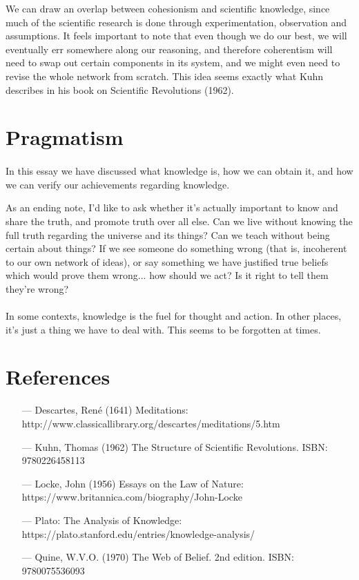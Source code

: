 \documentclass[11pt]{article}
\begin{document}
	We can draw an overlap between cohesionism and scientific knowledge, since much of the scientific research is done through experimentation, observation and assumptions. It feels important to note that even though we do our best, we will eventually err somewhere along our reasoning, and therefore coherentism will need to swap out certain components in its system, and we might even need to revise the whole network from scratch. This idea seems exactly what Kuhn describes in his book on Scientific Revolutions (1962).
	
	\pagebreak{}
	\section*{Pragmatism}
	\paragraph{} In this essay we have discussed what knowledge is, how we can obtain it, and how we can verify our achievements regarding knowledge.

	As an ending note, I'd like to ask whether it's actually important to know and share the truth, and promote truth over all else. Can we live without knowing the full truth regarding the universe and its things? Can we teach without being certain about things? If we see someone do something wrong (that is, incoherent to our own network of ideas), or say something we have justified true beliefs which would prove them wrong... how should we act? Is it right to tell them they're wrong?
	
	\paragraph{} In some contexts, knowledge is the fuel for thought and action. In other places, it's just a thing we have to deal with. This seems to be forgotten at times.

	\section*{References}
	\begin{itemize}
	\item[---] Descartes, René (1641) Meditations: http://www.classicallibrary.org/descartes/meditations/5.htm

	\item[---] Kuhn, Thomas (1962) The Structure of Scientific Revolutions. ISBN: 9780226458113

	\item[---] Locke, John (1956) Essays on the Law of Nature: https://www.britannica.com/biography/John-Locke

	\item[---] Plato: The Analysis of Knowledge: https://plato.stanford.edu/entries/knowledge-analysis/

	\item[---] Quine, W.V.O. (1970) The Web of Belief. 2nd edition. ISBN: 9780075536093


	\end{itemize}
\end{document}
